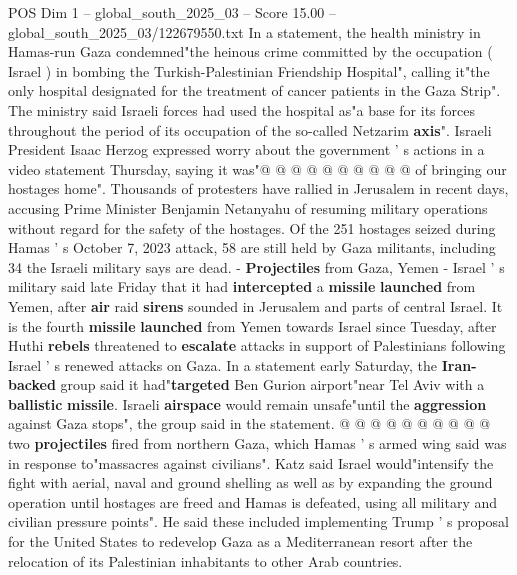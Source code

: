 \begin{textsample}{POS Dim 1 – global\_south\_2025\_03 – Score 15.00 – global\_south\_2025\_03/122679550.txt}
In a statement, the health ministry in Hamas-run Gaza condemned"the heinous crime committed by the occupation ( Israel ) in bombing the Turkish-Palestinian Friendship Hospital", calling it"the only hospital designated for the treatment of cancer patients in the Gaza Strip".
The ministry said Israeli forces had used the hospital as"a base for its forces throughout the period of its occupation of the so-called Netzarim \textbf{axis}".
Israeli President Isaac Herzog expressed worry about the government ' s actions in a video statement Thursday, saying it was"@ @ @ @ @ @ @ @ @ @ of bringing our hostages home".
Thousands of protesters have rallied in Jerusalem in recent days, accusing Prime Minister Benjamin Netanyahu of resuming military operations without regard for the safety of the hostages.
Of the 251 hostages seized during Hamas ' s October 7, 2023 attack, 58 are still held by Gaza militants, including 34 the Israeli military says are dead. - \textbf{Projectiles} from Gaza, Yemen - Israel ' s military said late Friday that it had \textbf{intercepted} a \textbf{missile} \textbf{launched} from Yemen, after \textbf{air} raid \textbf{sirens} sounded in Jerusalem and parts of central Israel.
It is the fourth \textbf{missile} \textbf{launched} from Yemen towards Israel since Tuesday, after Huthi \textbf{rebels} threatened to \textbf{escalate} attacks in support of Palestinians following Israel ' s renewed attacks on Gaza.
In a statement early Saturday, the \textbf{Iran-backed} group said it had"\textbf{targeted} Ben Gurion airport"near Tel Aviv with a \textbf{ballistic} \textbf{missile}.
Israeli \textbf{airspace} would remain unsafe"until the \textbf{aggression} against Gaza stops", the group said in the statement. @ @ @ @ @ @ @ @ @ @ two \textbf{projectiles} fired from northern Gaza, which Hamas ' s armed wing said was in response to"massacres against civilians".
Katz said Israel would"intensify the fight with aerial, naval and ground shelling as well as by expanding the ground operation until hostages are freed and Hamas is defeated, using all military and civilian pressure points".
He said these included implementing Trump ' s proposal for the United States to redevelop Gaza as a Mediterranean resort after the relocation of its Palestinian inhabitants to other Arab countries.

\end{textsample}
